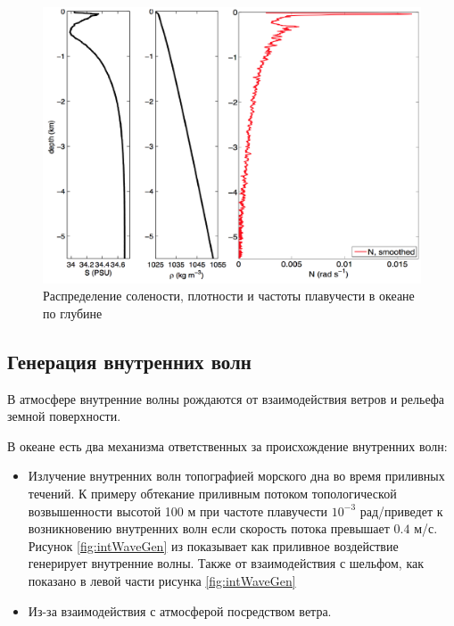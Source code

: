 \begin{figure}
    \centering
    \includegraphics[scale = 0.6]{pics/salinityAndNVsDepth.png}
    \caption{Распределение солености, плотности и частоты плавучести в океане по глубине}
    \label{fig:salVSdepth}
\end{figure}

\subsection{Генерация внутренних волн}

В атмосфере внутренние волны рождаются от взаимодействия ветров и рельефа земной поверхности.

В океане есть два механизма ответственных за происхождение внутренних волн:

\begin{itemize}
    \item Излучение внутренних волн топографией морского дна во время приливных течений. К примеру обтекание приливным потоком топологической возвышенности высотой 100 м при частоте плавучести $10^{-3}$ рад/приведет к возникновению внутренних волн если скорость потока превышает $0.4$ м/с. Рисунок \ref{fig:intWaveGen} из \cite{GarrettSc} показывает как приливное воздействие генерирует внутренние волны. Также от взаимодействия с шельфом, как показано в левой части рисунка \ref{fig:intWaveGen}
    \item Из-за взаимодействия с атмосферой посредством ветра. 
\end{itemize}

